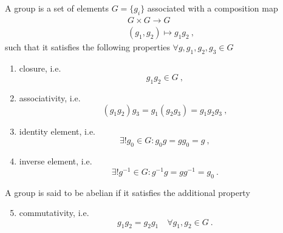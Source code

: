     \begin{definition}[Group]
        A group is a set of elements $G = \{g_i\}$ associated with a composition map 
        \begin{equation*}
        \begin{aligned}
            & G \times G \rightarrow G \\ & (g_1, g_2) \mapsto g_1 g_2 ~,
        \end{aligned}
        \end{equation*}
        such that it satisfies the following properties $\forall g,g_1,g_2,g_3 \in G$
        \begin{enumerate}
            \item closure, i.e.
            \begin{equation*}
                g_1 g_2 \in G ~,
            \end{equation*}
            \item associativity, i.e.
            \begin{equation*}
                (g_1 g_2)g_3 = g_1(g_2 g_3) = g_1 g_2 g_3 ~,
            \end{equation*}
            \item identity element, i.e.
            \begin{equation}\label{idgroup}
                \exists! g_0 \in G \colon g_0 g = g g_0 = g ~,
            \end{equation}
            \item inverse element, i.e.
            \begin{equation}\label{invgroup}
                \exists! g^{-1} \in G \colon g^{-1} g = g g^{-1} = g_0 ~.
            \end{equation}
        \end{enumerate}
    \end{definition}

    \begin{definition}
        A group is said to be abelian if it satisfies the additional property
        \begin{enumerate}
        \setcounter{enumi}{4}
            \item commutativity, i.e.
            \begin{equation*}
                g_1 g_2 = g_2 g_1 \quad \forall g_1, g_2 \in G ~.
            \end{equation*}
        \end{enumerate}
    \end{definition}

